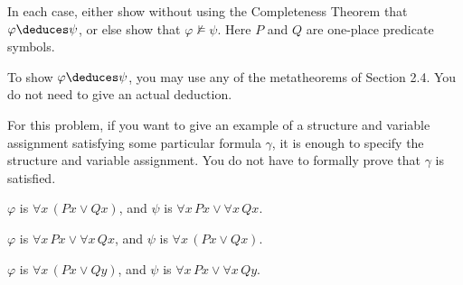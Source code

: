\begin{problem}

In each case, either show without using the Completeness Theorem that
$\varphi \deduces \psi$, or else show that $\varphi \not\models \psi$.
Here $P$ and $Q$ are one-place predicate symbols.

To show $\varphi \deduces \psi$, you may use any of the metatheorems of Section 2.4.  You do not need to give an actual deduction.

For this problem, if you want to give an example of a structure and variable
assignment satisfying some particular formula $\gamma$,
it is enough to specify the structure and variable assignment.
You do not have to formally prove that $\gamma$ is satisfied.

\begin{enumroman}
  \item $\varphi$ is $\forall x \, (Px \lor Qx)$, 
    and $\psi$ is $\forall x \, Px \lor \forall x \, Qx$.
    \begin{Answer}

    \end{Answer}
  \item $\varphi$ is $\forall x \, Px \lor \forall x \, Qx$,
    and $\psi$ is $\forall x \, (Px \lor Qx)$.
    \begin{Answer}

    \end{Answer}
  \item $\varphi$ is $\forall x \, (Px \lor Qy)$,
    and $\psi$ is $\forall x\, Px \lor \forall x \, Qy$.
    \begin{Answer}

    \end{Answer}
\end{enumroman}

\end{problem}


